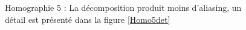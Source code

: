 \begin{figure}
\caption{Homographie 5 : La décomposition produit moins d'aliasing, un détail est présenté dans la figure \ref{Homo5det}}
\label{Homo5}
\end{figure}

